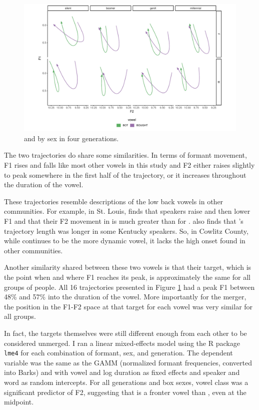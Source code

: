 \begin{figure}[tb!]
    \centering
    \includegraphics[width = 6.5in]{Figures/other_figures/low_back_trajs.pdf}
    \caption{\lot and \thought by sex in four generations.}
    \label{fig:bot_and_bought}
\end{figure}

The two trajectories do share some similarities. In terms of formant movement, F1 rises and falls like most other vowels in this study and F2 either raises slightly to peak somewhere in the first half of the trajectory, or it increases throughout the duration of the vowel.

These trajectories resemble descriptions of the low back vowels in other communities. For example, in St. Louis, \citet[176]{majors_2005} finds that speakers raise and then lower F1 and that their F2 movement in \thought is much greater than for \lot. \citet[159--161]{irons_2007} also finds that \thought's trajectory length was longer in some Kentucky speakers. So, in Cowlitz County, while \thought continues to be the more dynamic vowel, it lacks the high onset found in other communities.

Another similarity shared between these two vowels is that their target, which is the point when and where F1 reaches its peak, is approximately the same for all groups of people. All 16 trajectories presented in Figure \ref{fig:bot_and_bought} had a peak F1 between 48\% and 57\% into the duration of the vowel. More importantly for the merger, the position in the F1-F2 space at that target for each vowel was very similar for all groups.

In fact, the targets themselves were still different enough from each other to be considered unmerged. I ran a linear mixed-effects model using the R package \texttt{lme4} \citep{bates_etal_2015_lme4} for each combination of formant, sex, and generation. The dependent variable was the same as the GAMM (normalized formant frequencies, converted into Barks) and with vowel and log duration as fixed effects and speaker and word as random intercepts. For all generations and box sexes, vowel class was a significant predictor of F2, suggesting that \lot is a fronter vowel than \thought, even at the midpoint.

